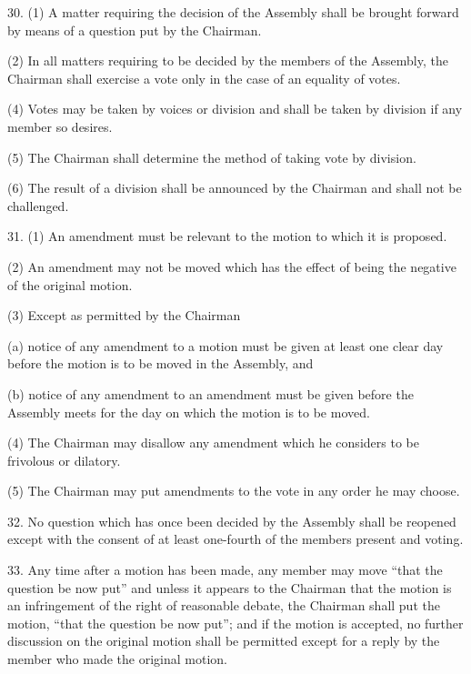 30. (1) A matter requiring the decision of the Assembly shall be brought forward by means of a question put by the Chairman.



(2) In all matters requiring to be decided by the members of the Assembly, the Chairman shall exercise a vote only in the case of an equality of votes.



(4) Votes may be taken by voices or division and shall be taken by division if any member so desires.



(5) The Chairman shall determine the method of taking vote by division.



(6) The result of a division shall be announced by the Chairman and shall not be challenged.



31. (1) An amendment must be relevant to the motion to which it is proposed.



(2) An amendment may not be moved which has the effect of being the negative of the original motion.



(3) Except as permitted by the Chairman\textemdash{}



(a) notice of any amendment to a motion must be given at least one clear day before the motion is to be moved in the Assembly, and

(b) notice of any amendment to an amendment must be given before the Assembly meets for the day on which the motion is to be moved.



(4) The Chairman may disallow any amendment which he considers to be frivolous or dilatory.



(5) The Chairman may put amendments to the vote in any order he may choose.



32. No question which has once been decided by the Assembly shall be reopened except with the consent of at least one-fourth of the members present and voting.



33. Any time after a motion has been made, any member may move \textquotedblleft{}that the question be now put\textquotedblright{} and unless it appears to the Chairman that the motion is an infringement of the right of reasonable debate, the Chairman shall put the motion, \textquotedblleft{}that the question be now put\textquotedblright{}; and if the motion is accepted, no further discussion on the original motion shall be permitted except for a reply by the member who made the original motion.



